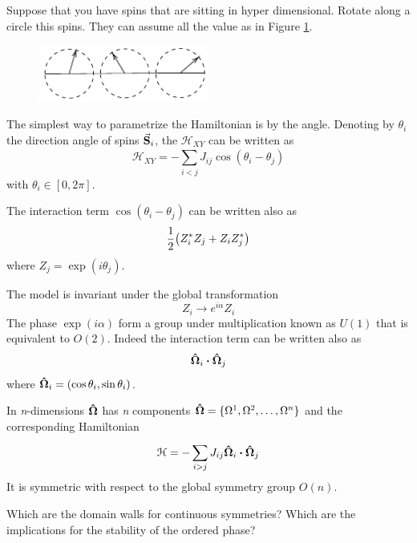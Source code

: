 \documentclass[../main/main.tex]{subfiles}
\begin{document}
Suppose that you have spins that are sitting in hyper dimensional. Rotate along a circle this spins. They can assume all the value as in Figure \ref{fig:10_2}.

\begin{figure}[h!]
\centering
\includegraphics[width=0.5\textwidth]{../lessons/10_image/2.pdf}
\caption{\label{fig:10_2} }
\end{figure}
The simplest way to parametrize the Hamiltonian is by the angle.
Denoting by \( \theta _i \) the direction angle of spins \( \va{S}_i \), the \( \mathcal{H}_{XY} \) can be written as
\begin{equation}
  \mathcal{H}_{XY} = - \sum_{i<j}^{} J_{ij} \cos(\theta _i - \theta _j)
\end{equation}
with \( \theta _i \in [0,2 \pi ] \).
\begin{remark}
The interaction term \( \cos(\theta _i - \theta _j)  \) can be written also as
\begin{equation}
  \frac{1}{2} \qty(Z_i^* Z_j + Z_i Z_j^*)
\end{equation}
where \(   Z_j = \exp (i \theta _j) \).
\end{remark}
The model is invariant under the global transformation
\begin{equation}
  Z_i \rightarrow e^{i \alpha } Z_i
\end{equation}
The phase  \( \exp (i \alpha )  \) form a group under multiplication known as \( U(1) \) that is equivalent to \( O(2) \). Indeed the interaction term can be written also as
\begin{equation}
  \vu{\Omega }_i \vdot \vu{\Omega }_j
\end{equation}
where \( \vu{\Omega }_i = ( \cos \theta _i, \sin \theta _i) \).
\begin{remark}
In \emph{n}-dimensions \( \vu{\Omega } \) has \emph{n} components  \( \vu{\Omega } = \{ \Omega ^1, \Omega ^2, \dots, \Omega ^n \}   \)  and the corresponding Hamiltonian
\begin{equation}
  \mathcal{H} = - \sum_{i>j}^{} J_{ij} \vu{\Omega }_i \vdot  \vu{\Omega }_j
\end{equation}
It is symmetric with respect to the global symmetry group \( O(n) \).
\end{remark}
 Which are the domain walls for continuous symmetries? Which are the implications for the stability of the ordered phase?
\end{document}
